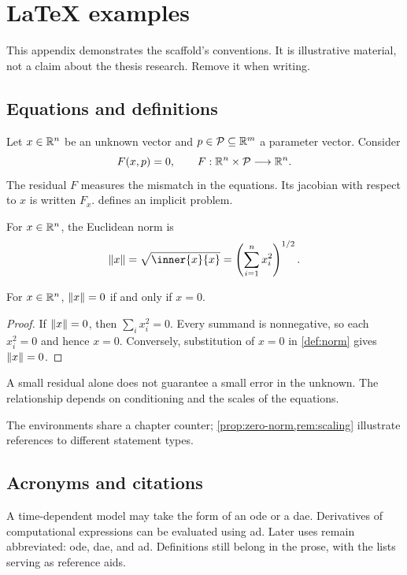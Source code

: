 \chapter{LaTeX examples}
\label{app:examples}
This appendix demonstrates the scaffold's conventions. It is illustrative
material, not a claim about the thesis research. Remove it when writing.

\section{Equations and definitions}
Let \(x\in\mathbb{R}^n\) be an unknown vector and
\(p\in\mathcal P\subseteq\mathbb{R}^m\) a parameter vector. Consider
\begin{equation}
  F(x,p)=0,\qquad F:\mathbb{R}^n\times\mathcal P\longrightarrow\mathbb{R}^n.
  \label{eq:residual}
\end{equation}
The \gls{residual} \(F\) measures the mismatch in the equations.
Its \gls{jacobian} with respect to \(x\) is written \(F_x\).
 defines an implicit problem.

\begin{definition}
  \label{def:norm}
  For \(x\in\mathbb{R}^n\), the Euclidean norm is
  \[
    \norm{x}=\sqrt{\inner{x}{x}}=\left(\sum_{i=1}^{n}x_i^2\right)^{1/2}.
  \]
\end{definition}

\begin{proposition}
  \label{prop:zero-norm}
  For \(x\in\mathbb{R}^n\), \(\lVert x\rVert=0\) if and only if \(x=0\).
\end{proposition}
\begin{proof}
  If \(\lVert x\rVert=0\), then \(\sum_i x_i^2=0\).
  Every summand is nonnegative, so each \(x_i^2=0\) and hence \(x=0\).
  Conversely, substitution of \(x=0\) in \cref{def:norm} gives \(\lVert x\rVert=0\).
\end{proof}

\begin{remark}
  \label{rem:scaling}
  A small residual alone does not guarantee a small error in the unknown.
  The relationship depends on conditioning and the scales of the equations.
\end{remark}
The environments share a chapter counter; \cref{prop:zero-norm,rem:scaling}
illustrate references to different statement types.

\section{Acronyms and citations}
A time-dependent model may take the form of an \gls{ode} or a \gls{dae}.
Derivatives of computational expressions can be evaluated using \gls{ad}.
Later uses remain abbreviated: \gls{ode}, \gls{dae}, and \gls{ad}.
Definitions still belong in the prose, with the lists serving as reference aids.

